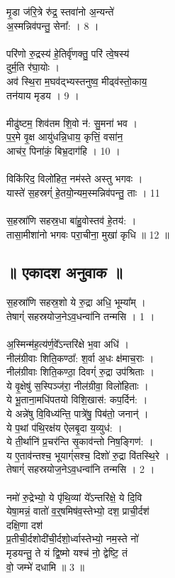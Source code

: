 मृ॒डा ज॑रि॒त्रे रु॑द्र॒ स्तवा॑नो अ॒न्यन्ते॑\\
अ॒स्मन्निव॑पन्तु॒ सेना᳚: । 8 ।\\
\\
परि॑णो रु॒द्रस्य॑ हे॒तिर्वृ॑णक्तु॒ परि॑ त्वे॒षस्य॑\\
दुर्म॒ति र॑घा॒योः ।\\
अव॑ स्थि॒रा म॒घव॑द्भ्यस्तनुष्व॒ मीढ्व॑स्तो॒काय॒\\
तन॑याय मृडय । 9 ।\\
\\
मीढु॑ष्टम॒ शिव॑तम शि॒वो न॑: सु॒मना॑ भव ।\\
प॒र॒मे वृ॒क्ष आयु॑धन्नि॒धाय॒ कृत्तिं॒ वसा॑न॒\\
आच॑र॒ पिना॑कं॒ बिभ्र॒दाग॑हि । 10 ।\\
\\
विकि॑रिद॒ विलो॑हित॒ नम॑स्ते अस्तु भगवः ।\\
यास्ते॑ स॒हस्रग्ं॑ हे॒तयो॒न्यम॒स्मन्निव॑पन्तु॒ ताः । 11\\
\\
स॒हस्रा॑णि सहस्र॒धा बा॑हु॒वोस्तव॑ हे॒तय॑: ।\\
तासा॒मीशा॑नो भगवः परा॒चीना॒ मुखा॑ कृधि ॥ 12 ॥\\
\subsection{॥ एकादश अनुवाक ॥}
स॒हस्रा॑णि सहस्र॒शो ये रु॒द्रा अधि॒ भूम्या᳚म् ।\\
तेषाग्ं॑ सहस्रयोज॒नेऽव॒धन्वा॑नि तन्मसि । 1 ।\\
\\
अ॒स्मिन्म॑ह॒त्य॑र्ण॒वे᳚ऽन्तरि॑क्षे भ॒वा अधि॑ ।\\
नील॑ग्रीवाः शिति॒कण्ठा᳚: श॒र्वा अ॒धः क्ष॑माच॒राः ।\\
नील॑ग्रीवाः शिति॒कण्ठा॒ दिवग्ं॑ रु॒द्रा उप॑श्रिताः ।\\
ये वृ॒क्षेषु॑ स॒स्पिञ्ज॑रा॒ नील॑ग्रीवा॒ विलो॑हिताः ।\\
ये भू॒ताना॒मधि॑पतयो विशि॒खास॑: कप॒र्दिन॑: ।\\
ये अन्ने॑षु वि॒विध्य॑न्ति॒ पात्रे॑षु॒ पिब॑तो॒ जनान्॑ ।\\
ये प॒थां प॑थि॒रक्ष॑य ऐलबृ॒दा य॒व्युध॑: ।\\
ये ती॒र्थानि॑ प्र॒चर॑न्ति सृ॒काव॑न्तो निष॒ङ्गिण॑: ।\\
य ए॒ताव॑न्तश्च॒ भूयाग्ं॑सश्च॒ दिशो॑ रु॒द्रा वि॑तस्थि॒रे ।\\
तेषाग्ं॑ सहस्रयोज॒नेऽव॒धन्वा॑नि तन्मसि । 2 ।\\
\\
नमो॑ रु॒द्रेभ्यो॒ ये पृ॑थि॒व्यां ये᳚ऽन्तरि॑क्षे॒ ये दि॒वि\\
येषा॒मन्नं॒ वातो॑ व॒र्॒षमिष॑व॒स्तेभ्यो॒ दश॒ प्राची॒र्दश॑\\
दक्षि॒णा दश॑ \\
प्र॒तीची॒र्दशोदी॑ची॒र्दशो॒र्ध्वास्तेभ्यो॒ नम॒स्ते नो॑\\
मृडयन्तु॒ ते यं द्वि॒ष्मो यश्च॑ नो॒ द्वेष्टि॒ तं\\
वो॒ जम्भे॑ दधामि ॥ 3 ॥\\
